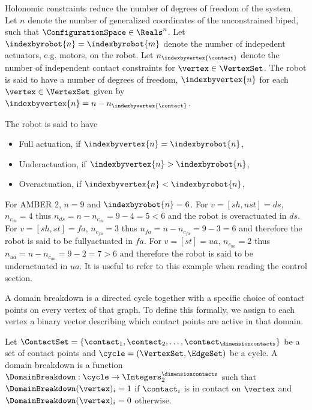 Holonomic constraints reduce the number of degrees of freedom of the system. Let $n$ denote the number of generalized coordinates of the unconstrained biped, such that $\ConfigurationSpace \in \Reals^n$. Let $\indexbyrobot{n} = \indexbyrobot{m}$ denote the number of indepedent actuators, e.g. motors, on the robot. Let $n_{\indexbyvertex{\contact}}$ denote the number of independent contact constraints for $\vertex \in \VertexSet$. The robot is said to have a number of degrees of freedom, $\indexbyvertex{n}$ for each $\vertex \in \VertexSet$ given by $\indexbyvertex{n} = n - n_{\indexbyvertex{\contact}}$.
\begin{mydefinition}
The robot is said to have
\begin{itemize}
 \item Full actuation, if  $\indexbyvertex{n} = \indexbyrobot{n}$,
 \item Underactuation, if $\indexbyvertex{n} > \indexbyrobot{n}$,
 \item Overactuation, if  $\indexbyvertex{n} < \indexbyrobot{n}$,
\end{itemize}
\end{mydefinition}
\begin{myexample}
 For AMBER 2, $n=9$ and $\indexbyrobot{n} = 6$. For $v=[sh,nst]= ds$, $n_{c_{ds}}=4$ thus $n_{ds} = n - n_{c_{ds}} = 9 - 4 = 5 < 6$ and the robot is overactuated in $ds$. For $v=[sh,st]= fa$, $n_{c_{fa}}=3$ thus $n_{fa} = n - n_{c_{fa}} = 9 - 3 = 6$ and therefore the robot is said to be fullyactuated in $fa$. For $v=[st]= ua$, $n_{c_{ua}}=2$ thus $n_{ua} = n - n_{c_{ua}} = 9 - 2 = 7>6$ and therefore the robot is said to be underactuated in $ua$. It is useful to refer to this example when reading the control section.
\end{myexample}

 A domain breakdown is a directed cycle together with a specific choice of contact points on every vertex of that graph. To define this formally, we assign to each vertex a binary vector describing which contact points are active in that domain.

\begin{mydefinition}
 Let $\ContactSet = \{ \contact_1, \contact_2, \ldots, \contact_\dimensioncontacts\}$ be a set of contact points and $\cycle = (\VertexSet, \EdgeSet)$ be a cycle. A domain breakdown is a function $\DomainBreakdown: \cycle \to \Integers_2^\dimensioncontacts$ such that $\DomainBreakdown(\vertex)_i = 1$ if $\contact_i$ is in contact on $\vertex$ and $\DomainBreakdown(\vertex)_i=0$ otherwise.
\end{mydefinition}

